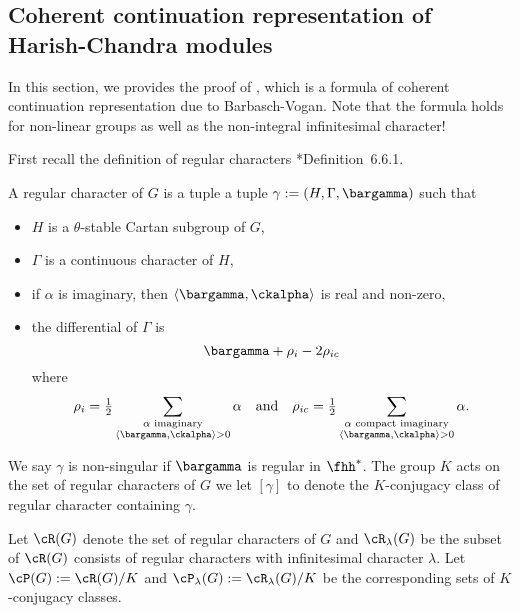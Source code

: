 \documentclass[counting_main.tex]{subfiles}
\begin{document}
\subsection{Coherent continuation representation of Harish-Chandra modules}

In this section, we provides the proof of , which is a formula of coherent continuation representation due to Barbasch-Vogan.
Note that the formula holds for non-linear groups as well as the non-integral
infinitesimal character!

\medskip

First recall the definition of regular characters \cite{Vg}*{Definition~6.6.1}.

A regular character of $G$ is a tuple a tuple $\gamma := (H,\Gamma,\bargamma)$
such that
\begin{itemize}
  \item $H$ is a $\theta$-stable Cartan subgroup of $G$,
  \item $\Gamma$ is a continuous character of $H$,
  \item if $\alpha$ is imaginary, then $\inn{\bargamma}{\ckalpha}$ is real and
        non-zero,
  \item the differential of $\Gamma$ is
        \[
        \bargamma+ \rho_{i} - 2\rho_{ic}
        \]
        where %
        \[
        \rho_{i} =\half\sum_{\substack{\alpha \text{
        imaginary}\\ \inn{\bargamma}{\ckalpha}>0}} \alpha \quad\text{and}\quad \rho_{ic} =\half\sum_{\substack{\alpha \text{
        compact imaginary}\\ \inn{\bargamma}{\ckalpha}>0}} \alpha.
        \]
\end{itemize}
We say $\gamma$ is non-singular if $\bargamma$ is regular in $\fhh^*$. The group $K$ acts on the set of regular characters of $G$ we let $[\gamma]$ to denote the $K$-conjugacy class of regular character containing $\gamma$.

Let $\cR(G)$ denote the set of regular characters of $G$ and $\cR_{\lambda}(G)$ be the subset of $\cR(G)$ consists of regular characters with infinitesimal character $\lambda$. Let $\cP(G):=\cR(G)/K$ and $\cP_{\lambda}(G):=\cR_{\lambda}(G)/K$ be the corresponding sets of $K$-conjugacy classes.
\end{document}
